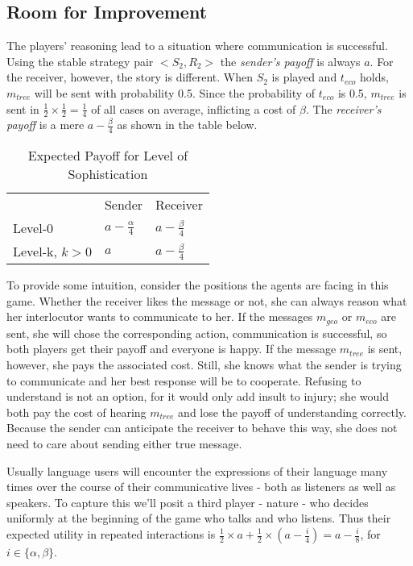 \documentclass[10pt]{article}
\begin{document}
\subsection{Room for Improvement}
The players' reasoning lead to a situation where communication is successful. Using the stable strategy pair $<S_2,R_2>$ the \textit{sender's payoff} is always $a$. For the receiver, however, the story is different. When $S_2$ is played and $t_{eco}$ holds, $m_{tree}$ will be sent with probability 0.5. Since the probability of $t_{eco}$ is 0.5, $m_{tree}$ is sent in $\tfrac{1}{2}\times \tfrac{1}{2} = \tfrac{1}{4}$ of all cases on average, inflicting a cost of $\beta$. The \textit{receiver's payoff} is a mere $a-\tfrac{\beta}{4}$ as shown in the table below.

\begin{table}[h]
\centering
\caption{Expected Payoff for Level of Sophistication}
\begin{tabular}{lll}
                                    & Sender                                  & Receiver                                \\ \cline{2-3}
\multicolumn{1}{l|}{Level-0}        & \multicolumn{1}{l|}{$a-\tfrac{\alpha}{4}$} & \multicolumn{1}{l|}{$a-\tfrac{\beta}{4}$} \\ \cline{2-3}
\multicolumn{1}{l|}{Level-k, $k>0$} & \multicolumn{1}{l|}{$a$}                  & \multicolumn{1}{l|}{$a-\tfrac{\beta}{4}$} \\ \cline{2-3}
\end{tabular}
\end{table}
To provide some intuition, consider the positions the agents are facing in this game. Whether the receiver likes the message or not, she can always reason what her interlocutor wants to communicate to her. If the messages $m_{geo}$ or $m_{eco}$ are sent, she will chose the corresponding action, communication is successful, so both players get their payoff and everyone is happy. If the message $m_{tree}$ is sent, however, she pays the associated cost. Still, she knows what the sender is trying to communicate and her best response will be to cooperate. Refusing to understand is not an option, for it would only add insult to injury; she would both pay the cost of hearing $m_{tree}$ and lose the payoff of understanding correctly. Because the sender can anticipate the receiver to behave this way, she does not need to care about sending either true message.

Usually language users will encounter the expressions of their language many times over the course of their communicative lives - both as listeners as well as speakers. To capture this we'll posit a third player - nature - who decides uniformly at the beginning of the game who talks and who listens. Thus their expected utility in repeated interactions is $\tfrac{1}{2}\times a + \tfrac{1}{2}\times (a-\tfrac{i}{4})=a-\tfrac{i}{8}$, for $i\in \{\alpha,\beta \}$.
\end{document}
